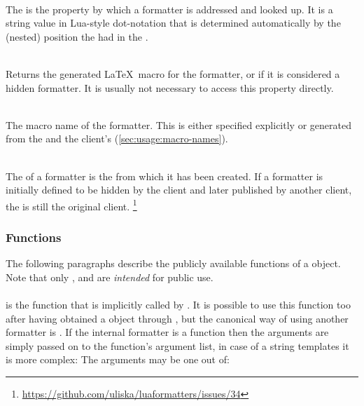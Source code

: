 \documentclass[12pt]{scrartcl}
\begin{document}
\begin{itemize*}
\item {}\\
The  is the property by which a formatter is addressed and looked
up.  It is a string value in Lua-style dot-notation that is determined
automatically by the (nested) position the  had in the
.

\item {}\\
Returns the generated \LaTeX\ macro for the formatter, or  if it is
considered a hidden formatter.  It is usually not necessary to access this
property directly.

\item {}\\
The macro name of the formatter.  This is either specified explicitly or
generated from the  and the client's 
(\vref{sec:usage:macro-names}).

\item {}\\
The  of a formatter is the  from which it has been
created.  If a formatter is initially defined to be hidden by the client and
later published by another client, the  is still the original
client.%
\footnote{ \url{https://github.com/uliska/luaformatters/issues/34}}

\end{itemize*}


\subsubsection{ Functions}
\label{sec:advanced:formatter-functions}

The following paragraphs describe the publicly available functions of a
 object.  Note that only ,
 and  are \emph{intended} for public
use.


\paragraph{}
\label{sec:advanced:formatter:apply}

is the function that is implicitly called by .  It is
possible to use this function too after having obtained a 
object through , but the canonical way of using
another formatter is .  If the internal formatter
is a function then the  arguments are simply passed on to the
function's argument list, in case of a string templates it is more complex: The
arguments may be one out of:
\end{document}
